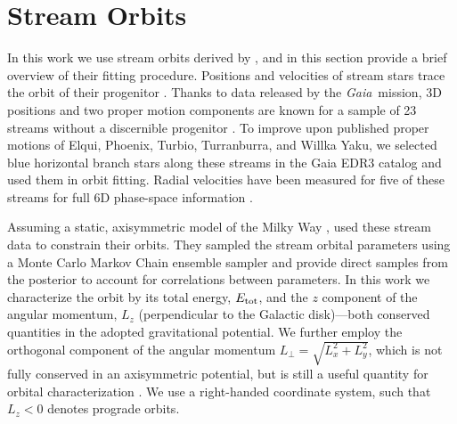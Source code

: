 \documentclass[twocolumn]{aastex63}
\newcommand{\gaia}{\textsl{Gaia}}
\begin{document}
% 

\section{Stream Orbits}
In this work we use stream orbits derived by \citet{bk2021}, and in this section provide a brief overview of their fitting procedure.
Positions and velocities of stream stars trace the orbit of their progenitor \citep[e.g.,][]{kuepper2010}.
Thanks to data released by the \gaia\ mission, 3D positions and two proper motion components are known for a sample of 23 streams without a discernible progenitor \citep{ibata2019, shipp2019, riley2020}.
To improve upon published proper motions of Elqui, Phoenix, Turbio, Turranburra, and Willka Yaku, we selected blue horizontal branch stars along these streams in the Gaia EDR3 catalog and used them in orbit fitting.
Radial velocities have been measured for five of these streams for full 6D phase-space information \citep{caldwell2020, li2020, bonaca2020b}.


Assuming a static, axisymmetric model of the Milky Way \citep[default \texttt{MilkyWayPotential}]{gala}, \citet{bk2021} used these stream data to constrain their orbits.
They sampled the stream orbital parameters using a Monte Carlo Markov Chain ensemble sampler and provide direct samples from the posterior to account for correlations between parameters.
In this work we characterize the orbit by its total energy, $E_{\rm tot}$, and the $z$ component of the angular momentum, $L_z$ (perpendicular to the Galactic disk)---both conserved quantities in the adopted gravitational potential.
We further employ the orthogonal component of the angular momentum $L_\perp = \sqrt{L_x^2 + L_y^2}$, which is not fully conserved in an axisymmetric potential, but is still a useful quantity for orbital characterization \citep{helmi1999}.
We use a right-handed coordinate system, such that $L_z<0$ denotes prograde orbits.
\end{document}
